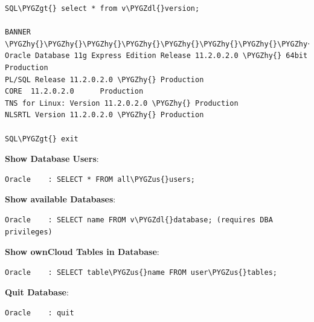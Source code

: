 \documentclass[letterpaper,10pt,english]{sphinxmanual}
\def\PYGZus{\char`\_}
\def\PYGZgt{\char`\>}
\def\PYGZdl{\char`\$}
\def\PYGZhy{\char`\-}
\begin{document}
\begin{Verbatim}[commandchars=\\\{\}]
SQL\PYGZgt{} select * from v\PYGZdl{}version;

BANNER
\PYGZhy{}\PYGZhy{}\PYGZhy{}\PYGZhy{}\PYGZhy{}\PYGZhy{}\PYGZhy{}\PYGZhy{}\PYGZhy{}\PYGZhy{}\PYGZhy{}\PYGZhy{}\PYGZhy{}\PYGZhy{}\PYGZhy{}\PYGZhy{}\PYGZhy{}\PYGZhy{}\PYGZhy{}\PYGZhy{}\PYGZhy{}\PYGZhy{}\PYGZhy{}\PYGZhy{}\PYGZhy{}\PYGZhy{}\PYGZhy{}\PYGZhy{}\PYGZhy{}\PYGZhy{}\PYGZhy{}\PYGZhy{}\PYGZhy{}\PYGZhy{}\PYGZhy{}\PYGZhy{}\PYGZhy{}\PYGZhy{}\PYGZhy{}\PYGZhy{}\PYGZhy{}\PYGZhy{}\PYGZhy{}\PYGZhy{}\PYGZhy{}\PYGZhy{}\PYGZhy{}\PYGZhy{}\PYGZhy{}\PYGZhy{}\PYGZhy{}\PYGZhy{}\PYGZhy{}\PYGZhy{}\PYGZhy{}\PYGZhy{}\PYGZhy{}\PYGZhy{}\PYGZhy{}\PYGZhy{}\PYGZhy{}\PYGZhy{}\PYGZhy{}\PYGZhy{}\PYGZhy{}\PYGZhy{}\PYGZhy{}\PYGZhy{}\PYGZhy{}\PYGZhy{}\PYGZhy{}\PYGZhy{}\PYGZhy{}\PYGZhy{}\PYGZhy{}\PYGZhy{}\PYGZhy{}\PYGZhy{}\PYGZhy{}\PYGZhy{}
Oracle Database 11g Express Edition Release 11.2.0.2.0 \PYGZhy{} 64bit Production
PL/SQL Release 11.2.0.2.0 \PYGZhy{} Production
CORE  11.2.0.2.0      Production
TNS for Linux: Version 11.2.0.2.0 \PYGZhy{} Production
NLSRTL Version 11.2.0.2.0 \PYGZhy{} Production

SQL\PYGZgt{} exit
\end{Verbatim}

\textbf{Show Database Users}:

\begin{Verbatim}[commandchars=\\\{\}]
Oracle    : SELECT * FROM all\PYGZus{}users;
\end{Verbatim}

\textbf{Show available Databases}:

\begin{Verbatim}[commandchars=\\\{\}]
Oracle    : SELECT name FROM v\PYGZdl{}database; (requires DBA privileges)
\end{Verbatim}

\textbf{Show ownCloud Tables in Database}:

\begin{Verbatim}[commandchars=\\\{\}]
Oracle    : SELECT table\PYGZus{}name FROM user\PYGZus{}tables;
\end{Verbatim}

\textbf{Quit Database}:

\begin{Verbatim}[commandchars=\\\{\}]
Oracle    : quit
\end{Verbatim}
\end{document}
